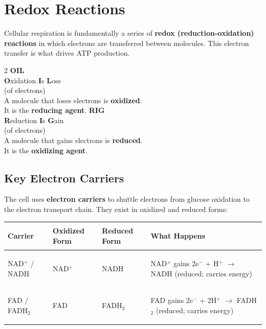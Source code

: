 \documentclass[11pt, letterpaper]{article}
\begin{document}
\section*{Redox Reactions}

Cellular respiration is fundamentally a series of \textbf{redox (reduction-oxidation) reactions} in which electrons are transferred between molecules. This electron transfer is what drives ATP production.

\begin{tcolorbox}[colback=craapbg, colframe=craapborder,
  title={\bfseries OIL RIG -- Remembering Redox}, arc=3pt, boxrule=1pt]
\begin{multicols}{2}
\centering
\textbf{OIL}\\
\textbf{O}xidation \textbf{I}s \textbf{L}oss\\
(of electrons)\\[6pt]
A molecule that loses electrons is \textbf{oxidized}.\\
It is the \textbf{reducing agent}.
\columnbreak
\centering
\textbf{RIG}\\
\textbf{R}eduction \textbf{I}s \textbf{G}ain\\
(of electrons)\\[6pt]
A molecule that gains electrons is \textbf{reduced}.\\
It is the \textbf{oxidizing agent}.
\end{multicols}
\end{tcolorbox}

\vspace{6pt}

\subsection*{Key Electron Carriers}

The cell uses \textbf{electron carriers} to shuttle electrons from glucose oxidation to the electron transport chain. They exist in oxidized and reduced forms:

\vspace{4pt}
\noindent
{\small\renewcommand{\arraystretch}{1.5}
\begin{tabularx}{\textwidth}{>{\bfseries\raggedright\arraybackslash}p{2.8cm}
                              >{\centering\arraybackslash}p{2.4cm}
                              >{\centering\arraybackslash}p{2.4cm}
                              >{\raggedright\arraybackslash}X}
\toprule
\rowcolor{tableheader}
\textbf{Carrier} & \textbf{Oxidized Form} & \textbf{Reduced Form} & \textbf{What Happens} \\
\midrule
\rowcolor{rowA} NAD$^+$ / NADH & NAD$^+$ & NADH & NAD$^+$ gains 2e$^-$ + H$^+$ $\to$ NADH (reduced; carries energy) \\
\rowcolor{rowBg} FAD / FADH$_2$ & FAD & FADH$_2$ & FAD gains 2e$^-$ + 2H$^+$ $\to$ FADH$_2$ (reduced; carries energy) \\
\bottomrule
\end{tabularx}}
\end{document}
